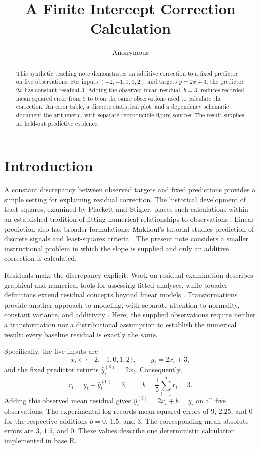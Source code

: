 \documentclass[11pt]{article}
\title{A Finite Intercept Correction Calculation}
\author{Anonymous}
\date{}
\begin{document}
\maketitle
\begin{abstract}
This synthetic teaching note demonstrates an additive correction to a fixed predictor on five observations. For inputs $(-2,-1,0,1,2)$ and targets $y=2x+3$, the predictor $2x$ has constant residual $3$. Adding the observed mean residual, $b=3$, reduces recorded mean squared error from $9$ to $0$ on the same observations used to calculate the correction. An error table, a discrete statistical plot, and a dependency schematic document the arithmetic, with separate reproducible figure sources. The result supplies no held-out predictive evidence.
\end{abstract}
\section{Introduction}

A constant discrepancy between observed targets and fixed predictions provides a simple setting for explaining residual correction. The historical development of least squares, examined by Plackett and Stigler, places such calculations within an established tradition of fitting numerical relationships to observations \cite{Plackett1972StudiesHistory,Stigler1981GaussInvention}. Linear prediction also has broader formulations: Makhoul's tutorial studies prediction of discrete signals and least-squares criteria \cite{Makhoul1975LinearPrediction}. The present note considers a smaller instructional problem in which the slope is supplied and only an additive correction is calculated.

Residuals make the discrepancy explicit. Work on residual examination describes graphical and numerical tools for assessing fitted analyses, while broader definitions extend residual concepts beyond linear models \cite{Anscombe1963ExaminationAnalysis,Cox1968GeneralDefinition}. Transformations provide another approach to modeling, with separate attention to normality, constant variance, and additivity \cite{Box1964AnalysisTransformations}. Here, the supplied observations require neither a transformation nor a distributional assumption to establish the numerical result: every baseline residual is exactly the same.

Specifically, the five inputs are
\[
x_i\in\{-2,-1,0,1,2\},\qquad y_i=2x_i+3,
\]
and the fixed predictor returns $\widehat{y}^{(0)}_i=2x_i$. Consequently,
\[
r_i=y_i-\widehat{y}^{(0)}_i=3,\qquad
b=\frac{1}{5}\sum_{i=1}^{5}r_i=3.
\]
Adding this observed mean residual gives
$\widehat{y}^{(b)}_i=2x_i+b=y_i$ on all five observations. The experimental log records mean squared errors of $9$, $2.25$, and $0$ for the respective additions $b=0$, $1.5$, and $3$. The corresponding mean absolute errors are $3$, $1.5$, and $0$. These values describe one deterministic calculation implemented in base R.
\end{document}
